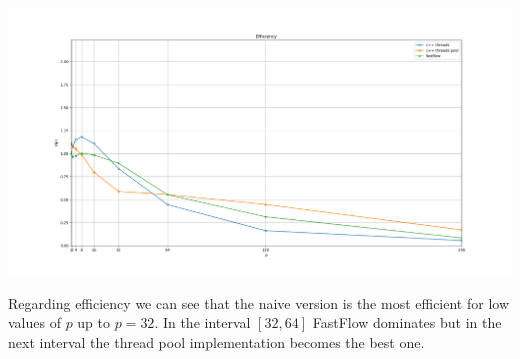 \documentclass[11pt]{article}
\begin{document}
\begin{center}
	\begin{minipage}{\linewidth}
		\includegraphics[width=\linewidth]{plots/EFFI-10-1024-10000.png}
	\end{minipage}
\end{center}
Regarding efficiency we can see that the naive version is the most efficient for low values of $ p $ up to $ p=32 $. In the interval $ [32, 64] $ FastFlow dominates but in the next interval the thread pool implementation becomes the best one.

\begin{center}

\end{center}

\begin{center}

\end{center}
\end{document}
